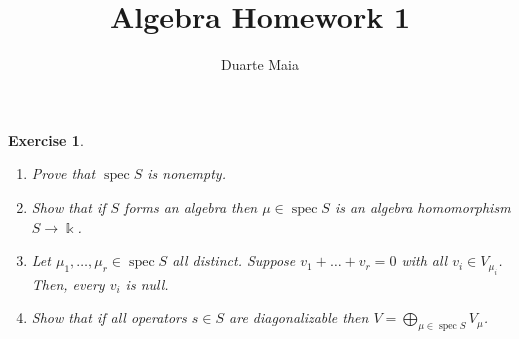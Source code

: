 \documentclass{article}
\title{Algebra Homework 1}
\author{Duarte Maia}
\newtheorem{ex}{Exercise}
\theoremstyle{nonumberplain}
\newcommand{\kk}{\Bbbk}
\DeclareMathOperator{\spec}{spec}
\begin{document}
\maketitle

\begin{ex}\leavevmode
\begin{enumerate}
\item Prove that $\spec S$ is nonempty.
\item Show that if $S$ forms an algebra then $\mu \in \spec S$ is an algebra homomorphism $S \to \kk$.
\item Let $\mu_1, \dots, \mu_r \in \spec S$ all distinct. Suppose $v_1 + \dots + v_r = 0$ with all $v_i \in V_{\mu_i}$. Then, every $v_i$ is null.
\item Show that if all operators $s \in S$ are diagonalizable then $V = \bigoplus_{\mu \in \spec S} V_\mu$.
\end{enumerate}
\end{ex}
\end{document}
